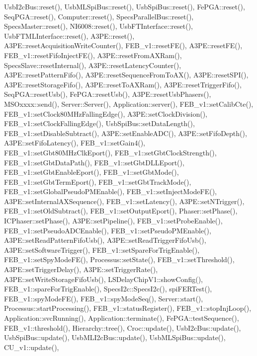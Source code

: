 Usb\+I2c\+Bus\+::reset(), Usb\+M\+L\+Spi\+Bus\+::reset(), Usb\+Spi\+Bus\+::reset(), Fe\+P\+G\+A\+::reset(), Seq\+P\+G\+A\+::reset(), Computer\+::reset(), Specs\+Parallel\+Bus\+::reset(), Specs\+Master\+::reset(), N\+I6008\+::reset(), Usb\+F\+T\+Interface\+::reset(), Usb\+F\+T\+M\+L\+Interface\+::reset(), A3\+P\+E\+::reset(), A3\+P\+E\+::reset\+Acquisition\+Write\+Counter(), F\+E\+B\+\_\+v1\+::reset\+F\+E(), A3\+P\+E\+::reset\+F\+E(), F\+E\+B\+\_\+v1\+::reset\+Fifo\+Inject\+F\+E(), A3\+P\+E\+::reset\+From\+A\+X\+Ram(), Specs\+Slave\+::reset\+Internal(), A3\+P\+E\+::reset\+Latency\+Counter(), A3\+P\+E\+::reset\+Pattern\+Fifo(), A3\+P\+E\+::reset\+Sequence\+From\+To\+A\+X(), A3\+P\+E\+::reset\+S\+P\+I(), A3\+P\+E\+::reset\+Storage\+Fifo(), A3\+P\+E\+::reset\+To\+A\+X\+Ram(), A3\+P\+E\+::reset\+Trigger\+Fifo(), Seq\+P\+G\+A\+::reset\+Usb(), Fe\+P\+G\+A\+::reset\+Usb(), A3\+P\+E\+::reset\+Usb\+Phasers(), M\+S\+Oxxxx\+::send(), Server\+::\+Server(), Application\+::server(), F\+E\+B\+\_\+v1\+::set\+Calib\+Cte(), F\+E\+B\+\_\+v1\+::set\+Clock80\+M\+Hz\+Falling\+Edge(), A3\+P\+E\+::set\+Clock\+Division(), F\+E\+B\+\_\+v1\+::set\+Clock\+Falling\+Edge(), Usb\+Spi\+Bus\+::set\+Data\+Length(), F\+E\+B\+\_\+v1\+::set\+Disable\+Subtract(), A3\+P\+E\+::set\+Enable\+A\+D\+C(), A3\+P\+E\+::set\+Fifo\+Depth(), A3\+P\+E\+::set\+Fifo\+Latency(), F\+E\+B\+\_\+v1\+::set\+Gain4(), F\+E\+B\+\_\+v1\+::set\+Gbt80\+M\+Hz\+Clk\+Eport(), F\+E\+B\+\_\+v1\+::set\+Gbt\+Clock\+Strength(), F\+E\+B\+\_\+v1\+::set\+Gbt\+Data\+Path(), F\+E\+B\+\_\+v1\+::set\+Gbt\+D\+L\+L\+Eport(), F\+E\+B\+\_\+v1\+::set\+Gbt\+Enable\+Eport(), F\+E\+B\+\_\+v1\+::set\+Gbt\+Mode(), F\+E\+B\+\_\+v1\+::set\+Gbt\+Term\+Eport(), F\+E\+B\+\_\+v1\+::set\+Gbt\+Track\+Mode(), F\+E\+B\+\_\+v1\+::set\+Global\+Pseudo\+P\+M\+Enable(), F\+E\+B\+\_\+v1\+::set\+Inject\+Mode\+F\+E(), A3\+P\+E\+::set\+Internal\+A\+X\+Sequence(), F\+E\+B\+\_\+v1\+::set\+Latency(), A3\+P\+E\+::set\+N\+Trigger(), F\+E\+B\+\_\+v1\+::set\+Old\+Subtract(), F\+E\+B\+\_\+v1\+::set\+Output\+Eport(), Phaser\+::set\+Phase(), I\+C\+Phaser\+::set\+Phase(), A3\+P\+E\+::set\+Pipeline(), F\+E\+B\+\_\+v1\+::set\+Probe\+Enable(), F\+E\+B\+\_\+v1\+::set\+Pseudo\+A\+D\+C\+Enable(), F\+E\+B\+\_\+v1\+::set\+Pseudo\+P\+M\+Enable(), A3\+P\+E\+::set\+Read\+Pattern\+Fifo\+Usb(), A3\+P\+E\+::set\+Read\+Trigger\+Fifo\+Usb(), A3\+P\+E\+::set\+Software\+Trigger(), F\+E\+B\+\_\+v1\+::set\+Spare\+For\+Trig\+Enable(), F\+E\+B\+\_\+v1\+::set\+Spy\+Mode\+F\+E(), Processus\+::set\+State(), F\+E\+B\+\_\+v1\+::set\+Threshold(), A3\+P\+E\+::set\+Trigger\+Delay(), A3\+P\+E\+::set\+Trigger\+Rate(), A3\+P\+E\+::set\+Write\+Storage\+Fifo\+Usb(), L\+S\+Delay\+Chip\+V1\+::show\+Config(), F\+E\+B\+\_\+v1\+::spare\+For\+Trig\+Enable(), Specs\+I2c\+::\+Specs\+I2c(), spi\+F\+E\+R\+Test(), F\+E\+B\+\_\+v1\+::spy\+Mode\+F\+E(), F\+E\+B\+\_\+v1\+::spy\+Mode\+Seq(), Server\+::start(), Processus\+::start\+Processing(), F\+E\+B\+\_\+v1\+::status\+Register(), F\+E\+B\+\_\+v1\+::stop\+Inj\+Loop(), Application\+::svc\+Running(), Application\+::terminate(), Fe\+P\+G\+A\+::test\+Sequence(), F\+E\+B\+\_\+v1\+::threshold(), Hierarchy\+::tree(), Croc\+::update(), Usb\+I2c\+Bus\+::update(), Usb\+Spi\+Bus\+::update(), Usb\+M\+L\+I2c\+Bus\+::update(), Usb\+M\+L\+Spi\+Bus\+::update(), C\+U\+\_\+v1\+::update(), 